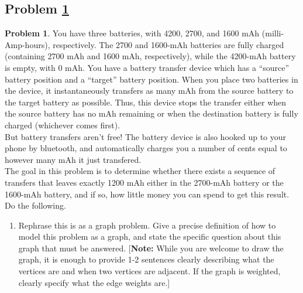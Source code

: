 \documentclass[11pt]{article}
\theoremstyle{definition}
\theoremstyle{definition}
\newtheorem{required}{Problem}
\theoremstyle{definition}
\begin{document}
\subsection{Problem \ref{Dijkstra2}} 
\begin{required} \label{Dijkstra2}
You have three batteries, with 4200, 2700, and 1600 mAh (milli-Amp-hours), respectively. The 2700 and 1600-mAh batteries are fully charged (containing 2700 mAh and 1600 mAh, respectively), while the 4200-mAh battery is empty, with 0 mAh. You have a battery transfer device which has a ``source'' battery position and a ``target'' battery position. When you place two batteries in the device, it instantaneously transfers as many mAh from the source battery to the target battery as possible. Thus, this device stops the transfer either when the source battery has no mAh remaining or when the destination battery is fully charged (whichever comes first).  \\

\noindent But battery transfers aren't free! The battery device is also hooked up to your phone by bluetooth, and automatically charges you a number of cents equal to however many mAh it just transfered.  \\
	
\noindent The goal in this problem is to determine whether there exists a sequence of transfers that leaves exactly 1200 mAh either in the 2700-mAh battery or the 1600-mAh battery, and if so, how little money you can spend to get this result. \\

\noindent Do the following.
\begin{enumerate}[label=(\alph*)]
\subsubsection{Problem 3\ref{Dijkstra2a}}
\item \label{Dijkstra2a} Rephrase this is as a graph problem. Give a precise definition of how to model this problem as a graph, and state the specific question about this graph that must be answered. [\textbf{Note:} While you are welcome to draw the graph, it is enough to provide 1-2 sentences clearly describing what the vertices are and when two vertices are adjacent. If the graph is weighted, clearly specify what the edge weights are.]


\end{enumerate}
\end{required}
\end{document}
